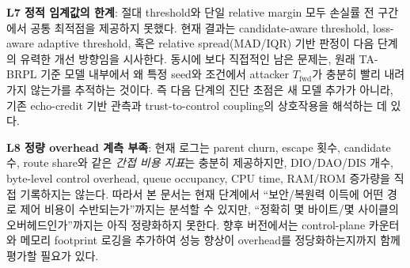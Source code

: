 \documentclass[12pt,a4paper]{article}
\begin{document}
\textbf{L7 정적 임계값의 한계}: 절대 threshold와 단일 relative margin 모두
손실률 전 구간에서 공통 최적점을 제공하지 못했다.
현재 결과는 candidate-aware threshold, loss-aware adaptive threshold,
혹은 relative spread(MAD/IQR) 기반 판정이 다음 단계의 유력한 개선 방향임을 시사한다.
동시에 보다 직접적인 남은 문제는,
원래 TA-BRPL 기준 모델 내부에서 왜 특정 seed와 조건에서 attacker $T_\text{fwd}$가 충분히 빨리 내려가지 않는가를
추적하는 것이다. 즉 다음 단계의 진단 초점은 새 모델 추가가 아니라,
기존 echo-credit 기반 관측과 trust-to-control coupling의 상호작용을 해석하는 데 있다.

\textbf{L8 정량 overhead 계측 부족}: 현재 로그는 parent churn, escape 횟수,
candidate 수, route share와 같은 \emph{간접 비용 지표}는 충분히 제공하지만,
DIO/DAO/DIS 개수, byte-level control overhead, queue occupancy, CPU time, RAM/ROM 증가량을
직접 기록하지는 않는다. 따라서 본 문서는 현재 단계에서
``보안/복원력 이득에 어떤 경로 제어 비용이 수반되는가''까지는 분석할 수 있지만,
``정확히 몇 바이트/몇 사이클의 오버헤드인가''까지는 아직 정량화하지 못한다.
향후 버전에서는 control-plane 카운터와 메모리 footprint 로깅을 추가하여
성능 향상이 overhead를 정당화하는지까지 함께 평가할 필요가 있다.
\end{document}
